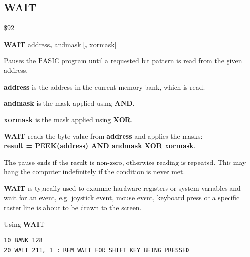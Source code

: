 \subsection{WAIT}
\begin{description}[leftmargin=2cm,style=nextline]
\item [Token:]    \$92

\item [Format:]   {\bf WAIT} address{\bf,} andmask [{\bf,} xormask]

\item [Usage:]    Pauses the BASIC program until a requested bit pattern is read from the given address.

                  {\bf address} is the address in the current memory bank, which is read.

                  {\bf andmask} is the mask applied using {\bf AND}.

                  {\bf xormask} is the mask applied using {\bf XOR}.

                  {\bf WAIT} reads the byte value from {\bf address} and applies the masks: \\
                  {\bf result = PEEK(address) AND andmask XOR xormask}.

                  The pause ends if the result is non-zero, otherwise reading is repeated. This may hang the computer indefinitely if the condition is never met.

\item [Remarks:]  {\bf WAIT} is typically used to examine hardware registers or system variables and wait for an event, e.g. joystick event, mouse event, keyboard press or a specific raster line is about to be drawn to the screen.

\item [Example:]  Using {\bf WAIT}

\begin{tcolorbox}[colback=black,coltext=white]
\verbatimfont{\codefont}
\begin{verbatim}
10 BANK 128
20 WAIT 211, 1 : REM WAIT FOR SHIFT KEY BEING PRESSED
\end{verbatim}
\end{tcolorbox}
\end{description}


\newpage
